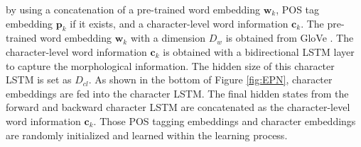 \documentclass[11pt,a4paper]{article}
\begin{document}
\noindent by using a concatenation of a pre-trained word embedding $\mathbf{w}_{k}$, POS tag embedding $\mathbf{p}_{k}$ if it exists, and a character-level word information $\mathbf{c}_k$.
The pre-trained word embedding $\mathbf{w}_k$ with a dimension $D_w$ is obtained from GloVe \cite{pennington2014glove}.
The character-level word information $\mathbf{c}_k$ is obtained with a bidirectional LSTM \cite{hochreiter1997long} layer to capture the morphological information. The hidden size of this character LSTM is set as $D_{cl}$.
As shown in the bottom of Figure \ref{fig:EPN}, character embeddings are fed into the character LSTM.
The final hidden states from the forward and backward character LSTM are concatenated as the character-level word information $\mathbf{c}_k$.
Those POS tagging embeddings and character embeddings are randomly initialized and learned within the learning process.
\end{document}
